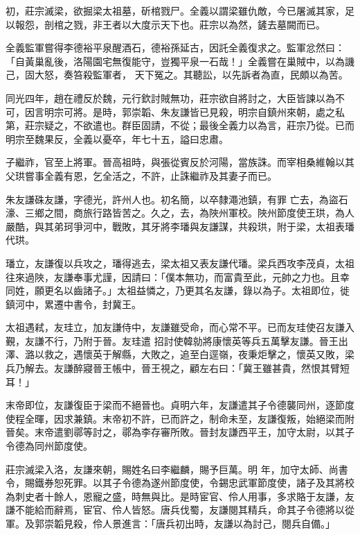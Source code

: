\begin{pinyinscope}
 初，莊宗滅梁，欲掘梁太祖墓，斫棺戮尸。全義以謂梁雖仇敵，今已屠滅其家，足以報怨，剖棺之戮，非王者以大度示天下也。莊宗以為然，鏟去墓闕而已。



 全義監軍嘗得李德裕平泉醒酒石，德裕孫延古，因託全義復求之。監軍忿然曰：「自黃巢亂後，洛陽園宅無復能守，豈獨平泉一石哉！」全義嘗在巢賊中，以為譏己，固大怒，奏笞殺監軍者，
 天下冤之。其聽訟，以先訴者為直，民頗以為苦。



 同光四年，趙在禮反於魏，元行欽討賊無功，莊宗欲自將討之，大臣皆諫以為不可，因言明宗可將。是時，郭崇韜、朱友謙皆已見殺，明宗自鎮州來朝，處之私第，莊宗疑之，不欲遣也。群臣固請，不從；最後全義力以為言，莊宗乃從。已而明宗至魏果反，全義以憂卒，年七十五，謚曰忠肅。



 子繼祚，官至上將軍。晉高祖時，與張從賓反於河陽，當族誅。而宰相桑維翰以其父珙嘗事全義有恩，乞全活之，不許，止誅繼祚及其妻子而已。



 朱友謙硃友謙，字德光，許州人也。初名簡，以卒隸澠池鎮，有罪
 亡去，為盜石濠、三鄉之間，商旅行路皆苦之。久之，去，為陜州軍校。陜州節度使王珙，為人嚴酷，與其弟珂爭河中，戰敗，其牙將李璠與友謙謀，共殺珙，附于梁，太祖表璠代珙。



 璠立，友謙復以兵攻之，璠得逃去，梁太祖又表友謙代璠。梁兵西攻李茂貞，太祖往來過陜，友謙奉事尤謹，因請曰：「僕本無功，而富貴至此，元帥之力也。且幸同姓，願更名以齒諸子。」太祖益憐之，乃更其名友謙，錄以為子。太祖即位，徙鎮河中，累遷中書令，封冀王。



 太祖遇弒，友珪立，加友謙侍中，友謙雖受命，而心常不平。已而友珪使召友謙入覲，友謙不行，乃附于晉。友珪遣
 招討使韓勍將康懷英等兵五萬擊友謙。晉王出澤、潞以救之，遇懷英于解縣，大敗之，追至白逕嶺，夜秉炬擊之，懷英又敗，梁兵乃解去。友謙醉寢晉王帳中，晉王視之，顧左右曰：「冀王雖甚貴，然恨其臂短耳！」



 末帝即位，友謙復臣于梁而不絕晉也。貞明六年，友謙遣其子令德襲同州，逐節度使程全暉，因求兼鎮。末帝初不許，已而許之，制命未至，友謙復叛，始絕梁而附晉矣。末帝遣劉鄩等討之，鄩為李存審所敗。晉封友謙西平王，加守太尉，以其子令德為同州節度使。



 莊宗滅梁入洛，友謙來朝，賜姓名曰李繼麟，賜予巨萬。明
 年，加守太師、尚書令，賜鐵券恕死罪。以其子令德為遂州節度使，令錫忠武軍節度使，諸子及其將校為刺史者十餘人，恩寵之盛，時無與比。是時宦官、伶人用事，多求賂于友謙，友謙不能給而辭焉，宦官、伶人皆怒。唐兵伐蜀，友謙閱其精兵，命其子令德將以從軍。及郭崇韜見殺，伶人景進言：「唐兵初出時，友謙以為討己，閱兵自備。」




\end{pinyinscope}
